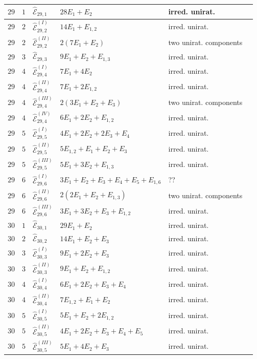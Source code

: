 \documentclass[11pt]{amsart}
\theoremstyle{definition}
\def\E{{\mathcal E}}
\begin{document}
\begin{minipage}[t]{\textwidth/2-1mm}
\begin{flushright}
{\begin{tabular}{ |l | l |l|l|l|l|}
$29$ & $1$ & $\widehat{\E}_{29,1}$ & $28E_1+E_2$ & irred. unirat. \\\hline
$29$ & $2$ & $\widehat{\E}_{29,2}^{(I)}$ & $14E_1+E_{1,2}$ & irred. unirat. \\
$29$ & $2$ & $\widehat{\E}_{29,2}^{(II)}$ & $2(7E_1+E_2)$ & two  unirat. components \\\hline
$29$ & $3$ & $\widehat{\E}_{29,3}$ & $9E_1+E_2+E_{1,3}$ & irred. unirat. \\\hline 

$29$ & $4$ & $\widehat{\E}_{29,4}^{(I)}$ & $7E_1+4E_2$ & irred. unirat.\\
$29$ & $4$ & $\widehat{\E}_{29,4}^{(II)}$ & $7E_1+2E_{1,2}$ & irred. unirat.\\
$29$ & $4$ & $\widehat{\E}_{29,4}^{(III)}$ & $2(3E_1+E_{2}+E_3)$ & two  unirat. components \\
$29$ & $4$ & $\widehat{\E}_{29,4}^{(IV)}$ & $6E_1+2E_2+E_{1,2}$  & irred. unirat.  \\\hline 

$29$ & $5$ & $\widehat{\E}_{29,5}^{(I)}$ & $4E_1+2E_2+2E_3+E_4$ & irred. unirat. \\
$29$ & $5$ & $\widehat{\E}_{29,5}^{(II)}$ & $5E_{1,2}+E_1+E_2+E_3$  & irred. unirat. \\
$29$ & $5$ & $\widehat{\E}_{29,5}^{(III)}$ & $5E_{1}+3E_2+E_{1,3}$  & irred. unirat.
\\\hline 

$29$ & $6$ & $\widehat{\E}_{29,6}^{(I)}$ & $3E_1+E_2+E_3+E_4+E_5+E_{1,6}$ & ?? \\
$29$ & $6$ & $\widehat{\E}_{29,6}^{(II)}$ & $2(2E_1+E_2+E_{1,3})$ & two  unirat. components \\
$29$ & $6$ & $\widehat{\E}_{29,6}^{(III)}$ & $3E_1+3E_2+E_3+E_{1,2}$ & irred. unirat. \\\hline\hline

$30$ & $1$ & $\widehat{\E}_{30,1}$ & $29E_1+E_2$ & irred. unirat. \\\hline
$30$ & $2$ & $\widehat{\E}_{30,2}$ & $14E_1+E_2+E_3$ & irred. unirat. \\\hline
$30$ & $3$ & $\widehat{\E}_{30,3}^{(I)}$ & $9E_1+2E_2+E_{3}$ & irred. unirat. \\
$30$ & $3$ & $\widehat{\E}_{30,3}^{(II)}$ & $9E_1+E_2+E_{1,2}$ & irred. unirat. \\\hline

$30$ & $4$ & $\widehat{\E}_{30,4}^{(I)}$ & $6E_1+2E_2+E_3+E_4$ & irred. unirat.\\
$30$ & $4$ & $\widehat{\E}_{30,4}^{(II)}$ & $7E_{1,2}+E_1+E_2$  & irred. unirat.\\\hline 
$30$ & $5$ & $\widehat{\E}_{30,5}^{(I)}$ & $5E_1+E_2+2E_{1,2}$ & irred. unirat. \\
$30$ & $5$ & $\widehat{\E}_{30,5}^{(II)}$ & $4E_1+2E_2+E_3+E_4+E_5$  & irred. unirat.\\
$30$ & $5$ & $\widehat{\E}_{30,5}^{(III)}$ & $5E_1+4E_2+E_3$  & irred. unirat.\\\hline 


\end{tabular}}
\end{flushright}
\end{minipage}
\end{document}
